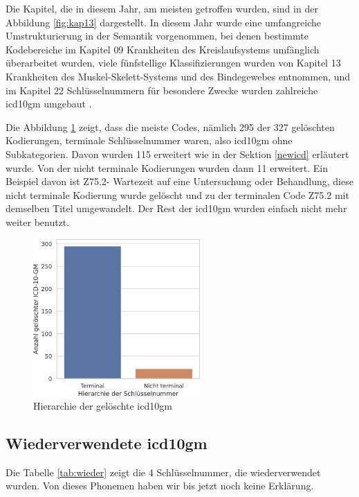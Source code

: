 Die Kapitel, die in diesem Jahr, am meisten getroffen wurden, sind in der Abbildung \ref{fig:kap13} dargestellt. In diesem Jahr wurde eine umfangreiche Umstrukturierung in der Semantik vorgenommen, bei denen bestimmte Kodebereiche im Kapitel \textsf{09} \textsf{Krankheiten des Kreislaufsystems} umfänglich überarbeitet wurden, viele fünfstellige Klassifizierungen wurden von Kapitel \textsf{13} \textsf{Krankheiten des Muskel-Skelett-Systems und des Bindegewebes} entnommen, und im Kapitel \textsf{22} \textsf{Schlüsselnummern für besondere Zwecke} wurden zahlreiche \ac{icd10gm} umgebaut \cite{dele13}.

Die Abbildung \ref{fig:oldicdort} zeigt, dass die meiste Codes, nämlich \textsf{295} der \textsf{327} gelöschten Kodierungen, terminale Schlüsselnummer waren, also \ac{icd10gm} ohne Subkategorien. Davon wurden \textsf{115} erweitert wie in der Sektion \ref{newicd} erläutert wurde. Von der nicht terminale Kodierungen wurden dann \textsf{11} erweitert. Ein Beispiel davon ist \textsf{Z75.2-} \textsf{Wartezeit auf eine Untersuchung oder Behandlung}, diese nicht terminale Kodierung wurde gelöscht und zu der terminalen Code \textsf{Z75.2} mit demselben Titel umgewandelt. Der Rest der \ac{icd10gm} wurden einfach nicht mehr weiter benutzt. 


\begin{figure}[ht]
	\centering
	\includegraphics[height=6cm]{figures/ortoldYear}
	\caption{Hierarchie der gelöschte \acs{icd10gm}}
	\label{fig:oldicdort}
\end{figure}


\subsection{Wiederverwendete \acs{icd10gm}}

Die Tabelle \ref{tab:wieder} zeigt die \textsf{4} Schlüsselnummer, die wiederverwendet wurden. Von dieses Phonemen haben wir bis jetzt noch keine Erklärung.

